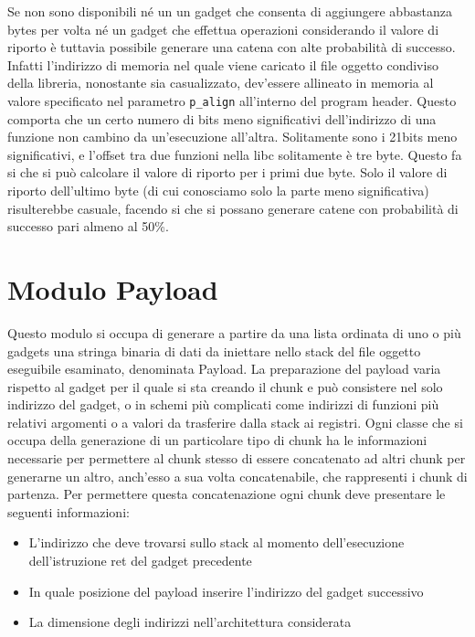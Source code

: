 Se non sono disponibili né un un gadget che consenta di aggiungere
abbastanza bytes per volta né un gadget che effettua operazioni
considerando il valore di riporto è tuttavia possibile generare una
catena con alte probabilità di successo. Infatti l'indirizzo di
memoria nel quale viene caricato il file oggetto condiviso della
libreria, nonostante sia casualizzato, dev'essere allineato in memoria
al valore specificato nel parametro \lstinline{p_align} all'interno
del program header. Questo comporta che un certo numero di bits meno
significativi dell'indirizzo di una funzione non cambino da
un'esecuzione all'altra. Solitamente sono i 21bits meno significativi,
e l'offset tra due funzioni nella libc solitamente è tre byte. Questo
fa si che si può calcolare il valore di riporto per i primi due
byte. Solo il valore di riporto dell'ultimo byte (di cui conosciamo
solo la parte meno significativa) risulterebbe casuale, facendo si che
si possano generare catene con probabilità di successo pari almeno al
50\%.


\section{Modulo Payload}

Questo modulo si occupa di generare a partire da una lista ordinata di
uno o più gadgets una stringa binaria di dati da iniettare nello stack
del file oggetto eseguibile esaminato, denominata Payload. La
preparazione del payload varia rispetto al gadget per il quale si sta
creando il chunk e può consistere nel solo indirizzo del gadget, o in
schemi più complicati come indirizzi di funzioni più relativi
argomenti o a valori da trasferire dalla stack ai registri. Ogni
classe che si occupa della generazione di un particolare tipo di chunk
ha le informazioni necessarie per permettere al chunk stesso di essere
concatenato ad altri chunk per generarne un altro, anch'esso a sua
volta concatenabile, che rappresenti i chunk di partenza. Per
permettere questa concatenazione ogni chunk deve presentare le
seguenti informazioni:


\begin{itemize}

\item L'indirizzo che deve trovarsi sullo stack al momento
  dell'esecuzione dell'istruzione ret del gadget precedente 

\item In quale posizione del payload inserire l'indirizzo del gadget
  successivo

\item La dimensione degli indirizzi nell'architettura considerata

\end{itemize}



